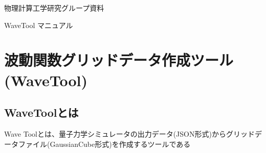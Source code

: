 \documentclass{jsarticle}
\begin{document}
\begin{flushright}
物理計算工学研究グループ資料
\end{flushright}

\begin{center}
\Huge{WaveTool マニュアル}
\end{center}

  \setcounter{page}{0}
  \tableofcontents
  \listoffigures
\newpage
{}


\section{波動関数グリッドデータ作成ツール(WaveTool)}
	\label{sec:wavetool}

\subsection{WaveToolとは}
Wave Toolとは、量子力学シミュレータの出力データ(JSON形式)からグリッドデータファイル(GaussianCube形式)を作成するツールである




\end{document}
